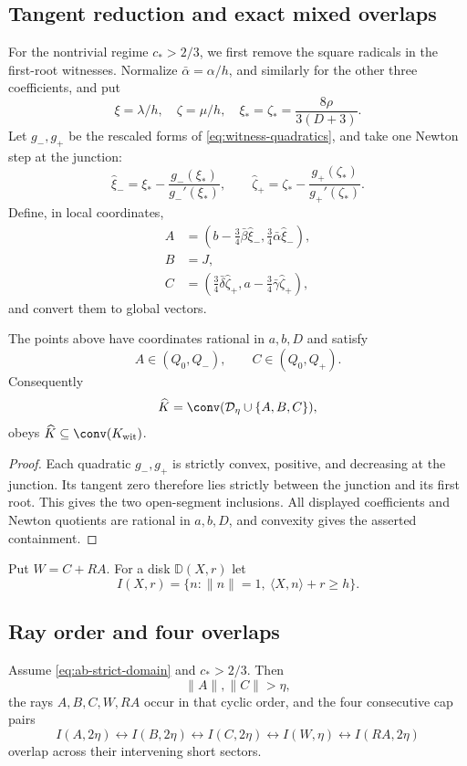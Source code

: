 \subsection{Tangent reduction and exact mixed overlaps}

For the nontrivial regime $c_*>2/3$, we first remove the square radicals in
the first-root witnesses.  Normalize
$\bar\alpha=\alpha/h$, and similarly for the other three coefficients, and
put
\[
 \xi=\lambda/h,\quad \zeta=\mu/h,\quad
 \xi_*=\zeta_*=\frac{8\rho}{3(D+3)}.
\]
Let $g_-,g_+$ be the rescaled forms of
\eqref{eq:witness-quadratics}, and take one Newton step at the junction:
\[
 \widehat\xi_-=\xi_*-\frac{g_-(\xi_*)}{g_-'(\xi_*)},\qquad
 \widehat\zeta_+=\zeta_*-\frac{g_+(\zeta_*)}{g_+'(\zeta_*)}.
\]
Define, in local coordinates,
\begin{align*}
 A&=\left(b-\frac34\bar\beta\widehat\xi_-,
          \frac34\bar\alpha\widehat\xi_-\right),\\
 B&=J,\\
 C&=\left(\frac34\bar\delta\widehat\zeta_+,
          a-\frac34\bar\gamma\widehat\zeta_+\right),
\end{align*}
and convert them to global vectors.

\begin{lemma}
\label{lem:technical-newton-reduction}
The points above have coordinates rational in $a,b,D$ and satisfy
\[
 A\in(Q_0,Q_-),\qquad C\in(Q_0,Q_+).
\]
Consequently
\[
 \widehat K=\conv(\mathcal D_\eta\cup\{A,B,C\}),
\]
obeys $\widehat K\subseteq\conv(K_{\rm wit})$.
\end{lemma}

\begin{proof}
Each quadratic $g_-,g_+$ is strictly convex, positive, and decreasing at
the junction.  Its tangent zero therefore lies strictly between the
junction and its first root.  This gives the two open-segment inclusions.
All displayed coefficients and Newton quotients are rational in $a,b,D$,
and convexity gives the asserted containment.
\end{proof}

Put $W=C+RA$.
For a disk $\mathbb D(X,r)$ let
\[
 I(X,r)=\{n:\lVert n\rVert=1,\ \langle X,n\rangle+r\ge h\}.
\]


\subsection{Ray order and four overlaps}

\begin{proposition}
\label{prop:technical-four-overlaps}
Assume \eqref{eq:ab-strict-domain} and $c_*>2/3$.  Then
\[
 \lVert A\rVert,\lVert C\rVert>\eta,
\]
the rays $A,B,C,W,RA$ occur in that cyclic order, and the four consecutive
cap pairs
\[
 I(A,2\eta)\leftrightarrow I(B,2\eta)
 \leftrightarrow I(C,2\eta)\leftrightarrow I(W,\eta)
 \leftrightarrow I(RA,2\eta)
\]
overlap across their intervening short sectors.
\end{proposition}

